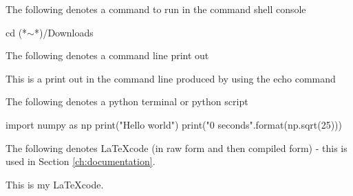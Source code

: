 \noindent The following denotes a command to run in the command shell console 
\begin{cmdbox}
cd (*$\sim$*)/Downloads
\end{cmdbox}
\vspace{0.5cm}

\noindent The following denotes a command line print out
\begin{cmdboxprint}
 This is a print out in the command line
 produced by using the echo command
\end{cmdboxprint}
\vspace{0.5cm}

\noindent The following denotes a python terminal or python script
\begin{pythonbox}
import numpy as np
print("Hello world")
print("{0} seconds".format(np.sqrt(25)))
\end{pythonbox}
\vspace{0.5cm}

\ifdevguide
\noindent The following denotes \LaTeX code (in raw form and then compiled form) - this is used in Section \ref{ch:documentation}.
\begin{latexbox}
This is my \LaTeX code.
\end{latexbox}
\fi